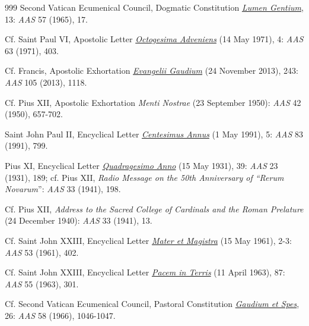 \documentclass{article}
\begin{document}
\begin{thebibliography}{999}
 Second Vatican Ecumenical Council, Dogmatic Constitution \href{https://www.vatican.va/archive/hist_councils/ii_vatican_council/documents/vat-ii_const_19641121_lumen-gentium_en.html}{\emph{Lumen Gentium}}, 13: \emph{AAS} 57 (1965), 17.

 Cf. Saint Paul VI, Apostolic Letter \href{https://www.vatican.va/content/paul-vi/en/apost_letters/documents/hf_p-vi_apl_19710514_octogesima-adveniens.html}{\emph{Octogesima Adveniens}} (14 May 1971), 4: \emph{AAS} 63 (1971), 403.

 Cf. Francis, Apostolic Exhortation \href{https://www.vatican.va/content/francesco/en/apost_exhortations/documents/papa-francesco_esortazione-ap_20131124_evangelii-gaudium.html}{\emph{Evangelii Gaudium}} (24 November 2013), 243: \emph{AAS} 105 (2013), 1118.

 Cf. Pius XII, Apostolic Exhortation \emph{Menti Nostrae} (23 September 1950): \emph{AAS} 42 (1950), 657-702.

 Saint John Paul II, Encyclical Letter \href{https://www.vatican.va/content/john-paul-ii/en/encyclicals/documents/hf_jp-ii_enc_01051991_centesimus-annus.html}{\emph{Centesimus Annus}} (1 May 1991), 5: \emph{AAS} 83 (1991), 799.

 Pius XI, Encyclical Letter \href{https://www.vatican.va/content/pius-xi/en/encyclicals/documents/hf_p-xi_enc_19310515_quadragesimo-anno.html}{\emph{Quadragesimo Anno}} (15 May 1931), 39: \emph{AAS} 23 (1931), 189; cf. Pius XII, \emph{Radio Message on the 50th Anniversary of ``Rerum Novarum}'': \emph{AAS} 33 (1941), 198.

 Cf. Pius XII, \emph{Address to the Sacred College of Cardinals and the Roman Prelature} (24 December 1940): \emph{AAS} 33 (1941), 13.

 Cf. Saint John XXIII, Encyclical Letter \href{https://www.vatican.va/content/john-xxiii/en/encyclicals/documents/hf_j-xxiii_enc_15051961_mater.html}{\emph{Mater et Magistra}} (15 May 1961), 2-3: \emph{AAS} 53 (1961), 402.

 Cf. Saint John XXIII, Encyclical Letter \href{https://www.vatican.va/content/john-xxiii/en/encyclicals/documents/hf_j-xxiii_enc_11041963_pacem.html}{\emph{Pacem in Terris}} (11 April 1963), 87: \emph{AAS} 55 (1963), 301.

 Cf. Second Vatican Ecumenical Council, Pastoral Constitution \href{https://www.vatican.va/archive/hist_councils/ii_vatican_council/documents/vat-ii_const_19651207_gaudium-et-spes_en.html}{\emph{Gaudium et Spes}}, 26: \emph{AAS} 58 (1966), 1046-1047.


\end{thebibliography}
\end{document}
